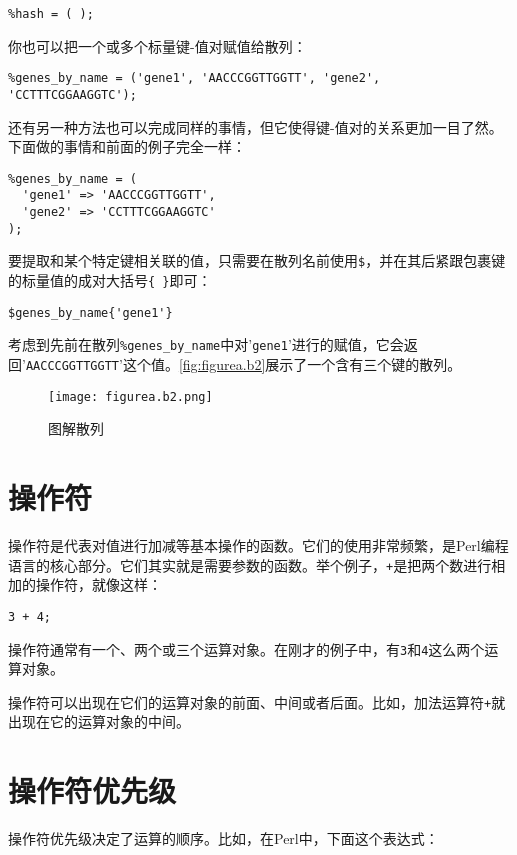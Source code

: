 \begin{lstlisting}
%hash = ( );
\end{lstlisting}

你也可以把一个或多个标量键-值对赋值给散列：

\begin{lstlisting}
%genes_by_name = ('gene1', 'AACCCGGTTGGTT', 'gene2', 'CCTTTCGGAAGGTC');
\end{lstlisting}

还有另一种方法也可以完成同样的事情，但它使得键-值对的关系更加一目了然。下面做的事情和前面的例子完全一样：

\begin{lstlisting}
%genes_by_name = (
  'gene1' => 'AACCCGGTTGGTT',
  'gene2' => 'CCTTTCGGAAGGTC'
);
\end{lstlisting}

要提取和某个特定键相关联的值，只需要在散列名前使用\verb|$|，并在其后紧跟包裹键的标量值的成对大括号\verb|{ }|即可：

\begin{lstlisting}
$genes_by_name{'gene1'}
\end{lstlisting}

考虑到先前在散列\verb|%genes_by_name|中对'\verb|gene1|'进行的赋值，它会返回'\verb|AACCCGGTTGGTT|'这个值。\autoref{fig:figurea.b2}展示了一个含有三个键的散列。

\begin{figure}
  \centering
  \texttt{[image: figurea.b2.png]}
  \caption{图解散列}
  \label{fig:figurea.b2}
 \end{figure}{}

\section{操作符}
操作符是代表对值进行加减等基本操作的函数。它们的使用非常频繁，是Perl编程语言的核心部分。它们其实就是需要参数的函数。举个例子，\verb|+|是把两个数进行相加的操作符，就像这样：

\begin{lstlisting}
3 + 4;
\end{lstlisting}

操作符通常有一个、两个或三个运算对象。在刚才的例子中，有\verb|3|和\verb|4|这么两个运算对象。

操作符可以出现在它们的运算对象的前面、中间或者后面。比如，加法运算符\verb|+|就出现在它的运算对象的中间。

\section{操作符优先级}
操作符优先级决定了运算的顺序。比如，在Perl中，下面这个表达式：

